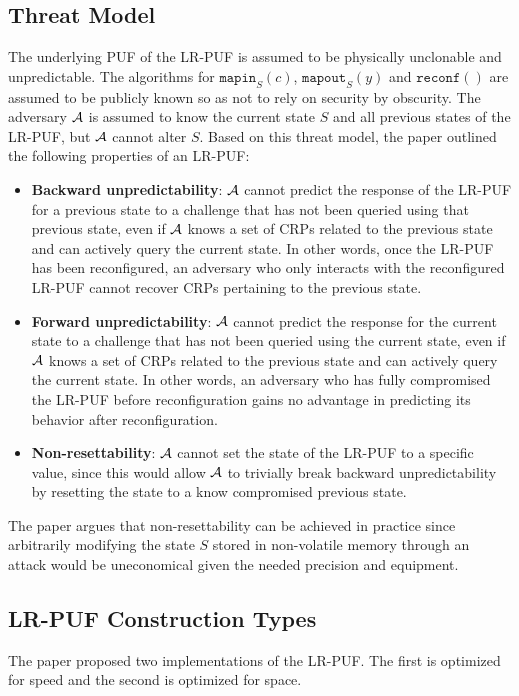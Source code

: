 \subsection{Threat Model}
The underlying PUF of the LR-PUF is assumed to be physically unclonable and unpredictable. The algorithms for $\texttt{mapin}_S(c)$, $\texttt{mapout}_S(y)$ and $\texttt{reconf}()$ are assumed to be publicly known so as not to rely on security by obscurity. The adversary $\mathcal{A}$ is assumed to know the current state $S$ and all previous states of the LR-PUF, but $\mathcal{A}$ cannot alter $S$. Based on this threat model, the paper outlined the following properties of an LR-PUF:
\begin{itemize}
    \item \textbf{Backward unpredictability}: $\mathcal{A}$ cannot predict the response of the LR-PUF for a previous state to a challenge that has not been queried using that previous state, even if $\mathcal{A}$ knows a set of CRPs related to the previous state and can actively query the current state. In other words, once the LR-PUF has been reconfigured, an adversary who only interacts with the reconfigured LR-PUF cannot recover CRPs pertaining to the previous state. 
    \item \textbf{Forward unpredictability}: $\mathcal{A}$ cannot predict the response for the current state to a challenge that has not been queried using the current state, even if $\mathcal{A}$ knows a set of CRPs related to the previous state and can actively query the current state. In other words, an adversary who has fully compromised the LR-PUF before reconfiguration gains no advantage in predicting its behavior after reconfiguration.
    \item \textbf{Non-resettability}: $\mathcal{A}$ cannot set the state of the LR-PUF to a specific value, since this would allow $\mathcal{A}$ to trivially break backward unpredictability by resetting the state to a know compromised previous state.
\end{itemize}

The paper argues that non-resettability can be achieved in practice since arbitrarily modifying the state $S$ stored in non-volatile memory through an attack would be uneconomical given the needed precision and equipment.

\subsection{LR-PUF Construction Types}
The paper proposed two implementations of the LR-PUF. The first is optimized for speed and the second is optimized for space.

